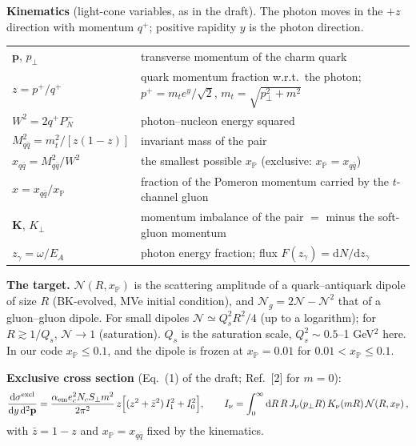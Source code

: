 \documentclass[12pt]{article}
\newcommand{\xpo}{x_{\mathbb{P}}}
\begin{document}
\textbf{Kinematics} (light-cone variables, as in the draft). The photon moves in the $+z$ direction
with momentum $q^+$; positive rapidity $y$ is the photon direction.
\begin{center}
\begin{tabular}{ll}
\toprule
$\mathbf{p}$, $p_\perp$ & transverse momentum of the charm quark \\
$z=p^+/q^+$ & quark momentum fraction w.r.t.\ the photon; $p^+=m_te^y/\sqrt2$, $m_t=\sqrt{p_\perp^2+m^2}$ \\
$W^2=2q^+P_N^-$ & photon--nucleon energy squared \\
$M_{q\bar q}^2=m_t^2/[z(1-z)]$ & invariant mass of the pair \\
$x_{q\bar q}=M_{q\bar q}^2/W^2$ & the smallest possible $\xpo$ (exclusive: $\xpo=x_{q\bar q}$) \\
$x=x_{q\bar q}/\xpo$ & fraction of the Pomeron momentum carried by the $t$-channel gluon \\
$\mathbf{K}$, $K_\perp$ & momentum imbalance of the pair $=$ minus the soft-gluon momentum \\
$z_\gamma=\omega/E_A$ & photon energy fraction; flux $F(z_\gamma)=\mathrm{d}N/\mathrm{d}z_\gamma$ \\
\bottomrule
\end{tabular}
\end{center}

\textbf{The target.} $\mathcal{N}(R,\xpo)$ is the scattering amplitude of a quark--antiquark dipole of
size $R$ (BK-evolved, MVe initial condition), and $\mathcal{N}_g=2\mathcal{N}-\mathcal{N}^2$ that of a
gluon--gluon dipole. For small dipoles $\mathcal{N}\simeq Q_s^2R^2/4$ (up to a logarithm); for
$R\gtrsim1/Q_s$, $\mathcal{N}\to1$ (saturation). $Q_s$ is the saturation scale, $Q_s^2\sim0.5$--1
GeV$^2$ here. In our code $\xpo\leq0.1$, and the dipole is frozen at $\xpo=0.01$ for
$0.01<\xpo\leq0.1$.

\textbf{Exclusive cross section} (Eq.~(1) of the draft; Ref.~[2] for $m=0$):
\[
  \frac{\mathrm{d}\sigma^{\rm excl}}{\mathrm{d}y\,\mathrm{d}^2\mathbf{p}}
  =\frac{\alpha_{\rm em}e_c^2N_cS_\perp m^2}{2\pi^2}\,z\Big[(z^2+\bar z^2)\,I_1^2+I_0^2\Big],\qquad
  I_\nu=\int_0^\infty\mathrm{d}R\,R\,J_\nu(p_\perp R)\,K_\nu(mR)\,\mathcal{N}(R,\xpo)\,,
\]
with $\bar z=1-z$ and $\xpo=x_{q\bar q}$ fixed by the kinematics.
\end{document}
